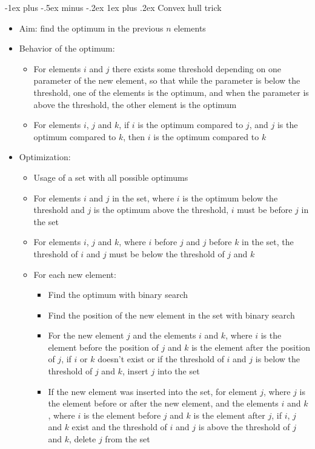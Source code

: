 \documentclass{article}
\makeatletter
\renewcommand{\subsubsection}{\@startsection{subsubsection}{3}{0mm}%
	{-1ex plus -.5ex minus -.2ex}%
	{1ex plus .2ex}%
	{\normalfont\small\bfseries}}
\makeatother
\begin{document}
\begin{landscape}
\begin{multicols}{2}
			\subsubsection{Convex hull trick}
			
			\begin{itemize}
				\item Aim: find the optimum in the previous $n$ elements
				\item Behavior of the optimum:
				\begin{itemize}
					\item For elements $i$ and $j$ there exists some threshold depending on one parameter of the new element, so that while the parameter is below the threshold, one of the elements is the optimum, and when the parameter is above the threshold, the other element is the optimum
					\item For elements $i$, $j$ and $k$, if $i$ is the optimum compared to $j$, and $j$ is the optimum compared to $k$, then $i$ is the optimum compared to $k$
				\end{itemize}
				\item Optimization:
				\begin{itemize}
					\item Usage of a set with all possible optimums
					\item For elements $i$ and $j$ in the set, where $i$ is the optimum below the threshold and $j$ is the optimum above the threshold, $i$ must be before $j$ in the set
					\item For elements $i$, $j$ and $k$, where $i$ before $j$ and $j$ before $k$ in the set, the threshold of $i$ and $j$ must be below the threshold of $j$ and $k$
					\item For each new element:
					\begin{itemize}
						\item Find the optimum with binary search
						\item Find the position of the new element in the set with binary search
						\item For the new element $j$ and the elements $i$ and $k$, where $i$ is the element before the position of $j$ and $k$ is the element after the position of $j$, if $i$ or $k$ doesn't exist or if the threshold of $i$ and $j$ is below the threshold of $j$ and $k$, insert $j$ into the set
						\item If the new element was inserted into the set, for element $j$, where $j$ is the element before or after the new element, and the elements $i$ and $k$, where $i$ is the element before $j$ and $k$ is the element after $j$, if $i$, $j$ and $k$ exist and the threshold of $i$ and $j$ is above the threshold of $j$ and $k$, delete $j$ from the set
					\end{itemize}
				\end{itemize}
			\end{itemize}
		

\end{multicols}
\end{landscape}
\end{document}
